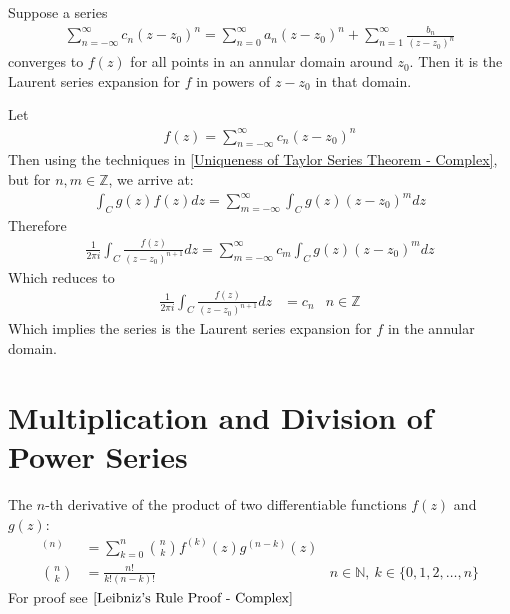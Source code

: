 \documentclass[12pt, english]{book}
\makeatletter
\renewenvironment{proof}[1][\proofname]{\par
	\pushQED{\qed}%
	\normalfont \topsep6\p@\@plus6\p@\relax
	\list{}{%
		\settowidth{\leftmargin}{\itshape\proofname:\hskip\labelsep}%
		\setlength{\labelwidth}{0pt}%
		\setlength{\itemindent}{-\leftmargin}%
	}%
	\item[\hskip\labelsep\itshape#1\@addpunct{:}]\ignorespaces
	}{ \popQED\endlist\@endpefalse}
\makeatother
\begin{document}
	\begin{theorem}
		\label{Uniqueness of Laurent Series Theorem - Complex}
		Suppose a series 
		\begin{align*}
			\sum_{n=-\infty}^{\infty} c_n (z-z_0)^n
			= 	\sum_{n=0}^{\infty} a_n (z-z_0)^n +	\sum_{n=1}^{\infty} \frac{b_n}{(z-z_0)^n}
		\end{align*}
		converges to \(f(z)\) for all points in an annular domain around \(z_0\). Then it is the Laurent series expansion for \(f\) in powers of \(z-z_0\) in that domain. 
	\end{theorem}
	\begin{proof}
		Let 
		\begin{align*}
			f(z) = \sum_{n=-\infty}^{\infty} c_n (z-z_0)^n
		\end{align*}
		Then using the techniques in \cref{Uniqueness of Taylor Series Theorem - Complex}, but for \(n, m \in \mathbb{Z}\), we arrive at:
		\begin{align*}
			\int_{C} g(z) f(z) dz = \sum_{m=-\infty}^{\infty} \int_{C} g(z) (z-z_0)^m dz
		\end{align*}
		Therefore
		\begin{align*}
			\frac{1}{2\pi i} \int_{C} \frac{f(z)}{(z-z_0)^{n+1}} dz 
			= \sum_{m=-\infty}^{\infty} c_m \int_{C} g(z) (z-z_0)^m dz
		\end{align*}
		Which reduces to 
		\begin{align*}
			\frac{1}{2\pi i} \int_{C} \frac{f(z)}{(z-z_0)^{n+1}} dz &= c_n
				& n \in \mathbb{Z}
		\end{align*}
		Which implies the series is the Laurent series expansion for \(f\) in the annular domain.
	\end{proof}
	
	\section{Multiplication and Division of Power Series} \label{Multiplication and Division of Power Series Section - Complex}
	
	\begin{definition}
		\label{Leibniz's Rule Definition - Complex}
		The \(n\)-th derivative of the product of two differentiable functions \(f(z)\) and \(g(z)\):
		\begin{align*}
			[f(z)g(z)]^{(n)} &= \sum_{k=0}^{n} \binom{n}{k} f^{(k)}(z) g^{(n-k)}(z) \\
			\binom{n}{k} &= \frac{n!}{k!(n-k)!} & n \in \mathbb{N}, \ k \in \{0, 1, 2, \ldots, n\}
		\end{align*}
		For proof see \(\cref{Leibniz's Rule Proof - Complex}\)
	\end{definition}
	
\end{document}
